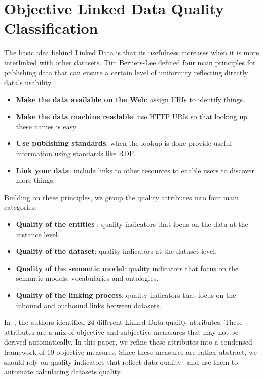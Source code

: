 
\section{Objective Linked Data Quality Classification}
\label{section:data-quality-classification}

The basic idea behind Linked Data is that its usefulness increases when it is more interlinked with other datasets. Tim Berners-Lee defined four main principles for publishing data that can ensure a certain level of uniformity reflecting directly data's usability~\cite{Berners-Lee:W3C:06}:

\begin{itemize}
	\item \textbf{Make the data available on the Web}: assign URIs to identify things.
	\item \textbf{Make the data machine readable}: use HTTP URIs so that looking up these names is easy.
	\item \textbf{Use publishing standards}: when the lookup is done provide useful information using standards like RDF.
	\item \textbf{Link your data}: include links to other resources to enable users to discover more things.
\end{itemize}

\noindent
Building on these principles, we group the quality attributes into four main categories:

\begin{itemize}
	\item \textbf{Quality of the entities }: quality indicators that focus on the data at the instance level.
	\item \textbf{Quality of the dataset}: quality indicators at the dataset level.
	\item \textbf{Quality of the semantic model}: quality indicators that focus on the semantic models, vocabularies and ontologies.
	\item \textbf{Quality of the linking process}: quality indicators that focus on the inbound and outbound links between datasets.
\end{itemize}

In~\cite{Assaf:DQMST:12}, the authors identified 24 different Linked Data quality attributes. These attributes are a mix of objective and subjective meaasures that may not be derived automatically. In this paper, we refine these attributes into a condensed framework of 10 objective measures. Since these measures are rather abstract, we should rely on quality indicators that reflect data quality~\cite{Flemming:Thesis:10} and use them to automate calculating datasets quality.

